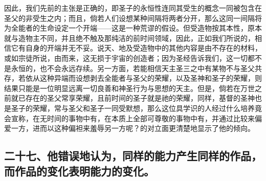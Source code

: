 因此，我们先前的主张是正确的，即圣子的永恒性连同其受生的概念一同被包含在圣父的非受生之内；而且，倘若人们设想某种间隔将两者分开，那么这同一间隔将为全能者的生命设定一个开端——这是一种荒谬的假设。但受造物按其本性，原本就与造物主不同，并且绝不触及那纯洁的前时间领域，因此，正如我们所说的，相信它有自身的开端并无不妥。说天、地及受造物中的其他内容是由不存在的材料，或如宗徒所说，由而来，这无损于宇宙的创造者；因为圣经告诉我们，这一切都不是永恒的，也不会永远存续。另一方面，若能相信天主圣三之中有某物不与圣父共存，若依从这种异端而设想剥去全能者与圣父的荣耀，以及圣神和圣子的荣耀，则结果只能是一位明显远离一切良善和神圣行为与思想的天主。但是，倘若在万世之前就已存在的圣父常享荣耀，且前时间的圣子就是祂的荣耀，同样，基督的圣神也是圣子的荣耀，常与圣父和圣子一同受默想，那么这位具学识的人经过什么培养竟会宣称，在无时间的事物中有，在本质上全部可尊敬的事物中有，并通过比较来偏爱一方，进而以这种偏袒来羞辱另一方呢？的对立面更清楚地显示了他的倾向。\par


\subsection{二十七、他错误地认为，同样的能力产生同样的作品，而作品的变化表明能力的变化。}

